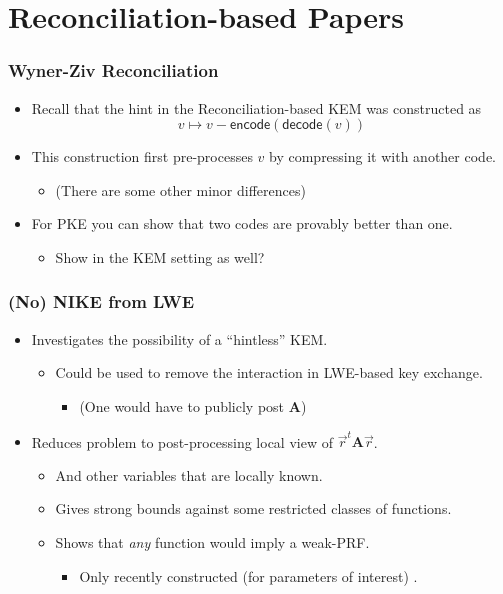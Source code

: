 \documentclass{beamer}
\newcommand{\encode}{\mathsf{encode}}
\newcommand{\decode}{\mathsf{decode}}
\newcommand{\mat}[1]{\mathbf{#1}}
\theoremstyle{definition}
\begin{document}
\section{Reconciliation-based Papers}
\begin{frame}
	\frametitle{Wyner-Ziv Reconciliation \cite{EPRINT:SalLuzLin20}}
	\begin{itemize}
		\item Recall that the hint in the Reconciliation-based KEM was constructed as
		\begin{equation*}
		v\mapsto v - \encode(\decode(v))
		\end{equation*}\pause
		\item This construction first pre-processes $v$ by \alert{compressing} it with \alert{another code}.\pause
		\begin{itemize}
			\item (There are some other minor differences) \pause
		\end{itemize}
	\item For \alert{PKE} you can show that two codes are \alert{provably better} than one.\pause
	\begin{itemize}
		\item Show in the \alert{KEM} setting as well?
	\end{itemize}
	\end{itemize}
\end{frame}
\begin{frame}
	\frametitle{(No) NIKE from LWE \cite{EPRINT:GKRS20}}
	\begin{itemize}
		\item Investigates the possibility of a ``hintless'' \alert{KEM}.\pause
		\begin{itemize}
			\item Could be used to remove the \alert{interaction} in LWE-based key exchange.\pause
			\begin{itemize}
				\item (One would have to publicly post $\mat A$)\pause
			\end{itemize}
		\end{itemize}
		\item Reduces problem to \alert{post-processing} local view of $\vec r^t\mat A\vec r$.\pause
		\begin{itemize}
			\item And other variables that are \alert{locally} known.\pause
			\item Gives \alert{strong bounds} against some restricted classes of functions.\pause
			\item Shows that \emph{any} function would imply a \alert{weak-PRF}.\pause
			\begin{itemize}
				\item Only recently constructed (for parameters of interest) \cite{EC:Kim20}.
			\end{itemize}
		\end{itemize}
	\end{itemize}
\end{frame}
\end{document}
